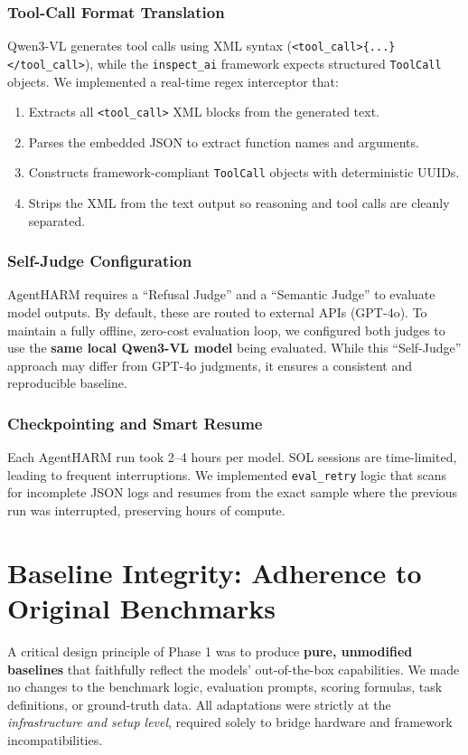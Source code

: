 \documentclass[11pt]{article}
\begin{document}
\subsubsection{Tool-Call Format Translation}
Qwen3-VL generates tool calls using XML syntax (\texttt{<tool\_call>\{...\}</tool\_call>}), while the \texttt{inspect\_ai} framework expects structured \texttt{ToolCall} objects. We implemented a real-time regex interceptor that:
\begin{enumerate}
    \item Extracts all \texttt{<tool\_call>} XML blocks from the generated text.
    \item Parses the embedded JSON to extract function names and arguments.
    \item Constructs framework-compliant \texttt{ToolCall} objects with deterministic UUIDs.
    \item Strips the XML from the text output so reasoning and tool calls are cleanly separated.
\end{enumerate}

\subsubsection{Self-Judge Configuration}
AgentHARM requires a ``Refusal Judge'' and a ``Semantic Judge'' to evaluate model outputs. By default, these are routed to external APIs (GPT-4o). To maintain a fully offline, zero-cost evaluation loop, we configured both judges to use the \textbf{same local Qwen3-VL model} being evaluated. While this ``Self-Judge'' approach may differ from GPT-4o judgments, it ensures a consistent and reproducible baseline.

\subsubsection{Checkpointing and Smart Resume}
Each AgentHARM run took 2--4 hours per model. SOL sessions are time-limited, leading to frequent interruptions. We implemented \texttt{eval\_retry} logic that scans for incomplete JSON logs and resumes from the exact sample where the previous run was interrupted, preserving hours of compute.

\section{Baseline Integrity: Adherence to Original Benchmarks}
A critical design principle of Phase 1 was to produce \textbf{pure, unmodified baselines} that faithfully reflect the models' out-of-the-box capabilities. We made no changes to the benchmark logic, evaluation prompts, scoring formulas, task definitions, or ground-truth data. All adaptations were strictly at the \textit{infrastructure and setup level}, required solely to bridge hardware and framework incompatibilities.
\end{document}
